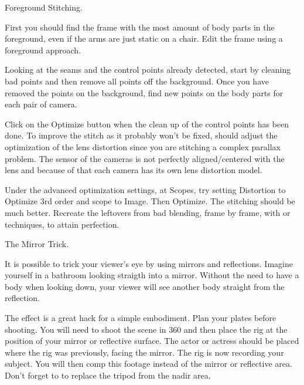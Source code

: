 \begin{fullwidth}

\clearpage
{\large Foreground Stitching. \par}

First you should find the frame with the most amount of body parts in the foreground, even if the arms are just static on a chair. Edit the frame using a foreground approach.

Looking at the seams and the control points already detected, start by cleaning bad points and then remove all points off the background. Once you have removed the points on the background, find new points on the body parts for each pair of camera.

Click on the Optimize button when the clean up of the control points has been done. To improve the stitch as it probably won’t be fixed, should adjust the optimization of the lens distortion since you are stitching a complex parallax problem. The sensor of the cameras is not perfectly aligned/centered with the lens and because of that each camera has its own lens distortion model. 

Under the advanced optimization settings, at Scopes, try setting Distortion to Optimize 3rd order and scope to Image. Then Optimize. The stitching should be much better. Recreate the leftovers from bad blending, frame by frame, with \textbf{} or \textbf{} techniques, to attain perfection.
\clearpage
{\large The Mirror Trick. \par}

It is possible to trick your viewer's eye by using mirrors and reflections. Imagine yourself in a bathroom looking straigth into a mirror. Without the need to have a body when looking down, your viewer will see another body straight from the reflection. 

The effect is a great hack for a simple embodiment. Plan your plates before shooting. You will need to shoot the scene in 360 and then place the rig at the position of your mirror or reflective surface. The actor or actress should be placed where the rig was previously, facing the mirror. The rig is now recording your subject. You will then comp this footage instead of the mirror or reflective area. Don't forget to \textbf{} to replace the tripod from the nadir area.


\clearpage
\end{fullwidth}